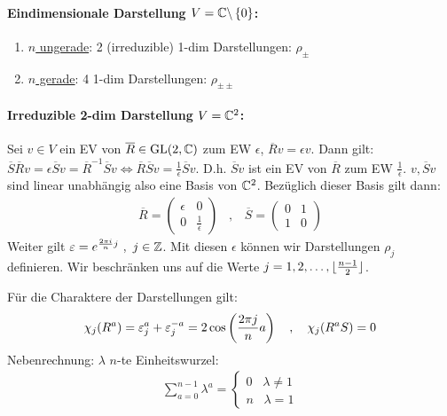 \paragraph{Eindimensionale Darstellung $V = \mathbb{C} \backslash \left\{ 0 \right\}$:}
\begin{enumerate}[]
    \item \underline{$n$ ungerade}: 2 (irreduzible) 1-dim Darstellungen: $\rho_{\pm}$
    \item \underline{$n$ gerade}: 4 1-dim Darstellungen: $\rho_{\pm \pm}$
\end{enumerate}

\paragraph{Irreduzible 2-dim Darstellung $V = \mathbb{C}^2$:}
Sei $v \in V$ ein EV von $\overline{R} \in \text{GL}(2,\mathbb{C})$ zum EW $\epsilon$,
$\overline{R} v = \epsilon v$. Dann gilt: $\overline{S} \overline{R} v
= \epsilon \overline{S} v = \overline{R}^{-1} \overline{S} v \Leftrightarrow
\overline{R} \overline{S} v = \frac{1}{\epsilon} \overline{S} v$. D.h.
$\overline{S} v$ ist ein EV von $\overline{R}$ zum EW $\frac{1}{\epsilon}$.
$v,\overline{S}v$ sind linear unabhängig also eine Basis von $\mathbb{C}^2$. Bezüglich
dieser Basis gilt dann:
\begin{align*}
    \overline{R} = \begin{pmatrix}
        \epsilon & 0 \\ 0 & \frac{1}{\epsilon}
    \end{pmatrix}
    \hspace{10pt} , \hspace{10pt}
    \overline{S} = \begin{pmatrix}
        0 & 1 \\ 1 & 0
    \end{pmatrix}
\end{align*}
Weiter gilt $\varepsilon = e^{\frac{2 \pi i}{n} j} \ , \ j \in \mathbb{Z}$.
Mit diesen $\epsilon$ können wir Darstellungen $\rho_j$ definieren.
Wir beschränken uns auf die Werte $j=1,2,\dots,\lfloor \frac{n-1}{2} \rfloor$.

Für die Charaktere der Darstellungen gilt:
\begin{align*}
    \chi_j (R^a) = \varepsilon_j^a + \varepsilon_j^{-a} = 2 \cos \left( \frac{2 \pi j}{n} a \right)
    \hspace{10pt} , \hspace{10pt}
    \chi_j (R^a S) = 0
\end{align*}
Nebenrechnung: $\lambda$ $n$-te Einheitswurzel:
\begin{align*}
    \sum_{a=0}^{n-1} \lambda^a = \begin{cases}
        0 \hspace{10pt} \lambda \neq 1
        \\
        n \hspace{10pt} \lambda = 1
    \end{cases}
\end{align*}

